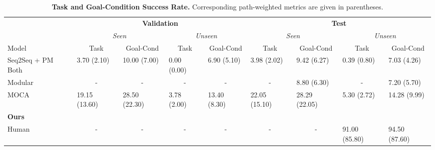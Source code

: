 \documentclass[11pt,a4paper]{article}
\begin{document}
\begin{table}[]
\centering
\resizebox{\textwidth}{!}
{\begin{tabular}{@{}lllllllll@{}}
\toprule
                         & \multicolumn{4}{c}{\textbf{Validation}}                                                                             & \multicolumn{4}{c}{\textbf{Test}}                                                                                   \\
                         & \multicolumn{2}{c}{\textit{Seen}}                        & \multicolumn{2}{c}{\textit{Unseen}}                      & \multicolumn{2}{c}{\textit{Seen}}                        & \multicolumn{2}{c}{\textit{Unseen}}                      \\
Model                    & \multicolumn{1}{c}{Task} & \multicolumn{1}{c}{Goal-Cond} & \multicolumn{1}{c}{Task} & \multicolumn{1}{c}{Goal-Cond} & \multicolumn{1}{c}{Task} & \multicolumn{1}{c}{Goal-Cond} & \multicolumn{1}{c}{Task} & \multicolumn{1}{c}{Goal-Cond} \\ \midrule
Seq2Seq + PM Both \cite{shridhar2020alfred}                & 3.70 (2.10)              & 10.00 (7.00)                  & 0.00 (0.00)              & 6.90 (5.10)                   & 3.98 (2.02)              & 9.42 (6.27)                   & 0.39 (0.80)              & 7.03 (4.26)                   \\
Modular \cite{corona2020modularity}          & \multicolumn{1}{c}{-}    & \multicolumn{1}{c}{-}         & \multicolumn{1}{c}{-}    & \multicolumn{1}{c}{-}         & \multicolumn{1}{c}{-}    & 8.80 (6.30)                   & \multicolumn{1}{c}{-}    & 7.20 (5.70)                   \\
MOCA \cite{singh2020moca}                     & 19.15 (13.60)            & 28.50 (22.30)                 & 3.78 (2.00)              & 13.40 (8.30)                  & 22.05 (15.10)            & 28.29 (22.05)                 & 5.30 (2.72)              & 14.28 (9.99)                  \\
\textbf{Ours}            &                          &                               &                          &                               &                          &                               &                          &                               \\ \midrule
Human                    & \multicolumn{1}{c}{-}    & \multicolumn{1}{c}{-}         & \multicolumn{1}{c}{-}    & \multicolumn{1}{c}{-}         & \multicolumn{1}{c}{-}    & \multicolumn{1}{c}{-}         & 91.00 (85.80)            & 94.50 (87.60)                 \\\bottomrule
\end{tabular}}
\caption{\textbf{Task and Goal-Condition Success Rate.} Corresponding path-weighted metrics are given in parentheses.}
\label{tab:results}
\end{table}
\end{document}
